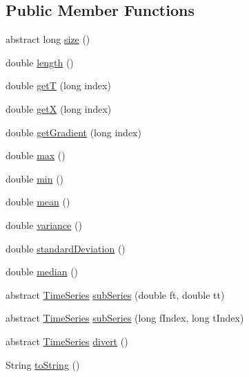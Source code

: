 \subsection*{Public Member Functions}
\begin{DoxyCompactItemize}
\item 
abstract long \hyperlink{classtimeseries_1_1_time_series_a390324a52568f45892838f08142b8e44}{size} ()
\item 
double \hyperlink{classtimeseries_1_1_time_series_a21a48f6a58aefd8b7261acccfc442425}{length} ()
\item 
double \hyperlink{classtimeseries_1_1_time_series_a756d884d57220f887a2425e850450f33}{get\+T} (long index)
\item 
double \hyperlink{classtimeseries_1_1_time_series_a1bf3cb62b9976193264b68ef8d001919}{get\+X} (long index)
\item 
double \hyperlink{classtimeseries_1_1_time_series_a0cd53da9484fd4ee3b5c5110e79c0a7e}{get\+Gradient} (long index)
\item 
double \hyperlink{classtimeseries_1_1_time_series_ac841bb482c0ef9fe79839c255406c8c6}{max} ()
\item 
double \hyperlink{classtimeseries_1_1_time_series_a06f25367736b3f59807e6f060650bc7e}{min} ()
\item 
double \hyperlink{classtimeseries_1_1_time_series_a70d9b8388e8b729ce9a719b25d3016aa}{mean} ()
\item 
double \hyperlink{classtimeseries_1_1_time_series_a255d92682fb235b5c9dbb4d803d7f8d3}{variance} ()
\item 
double \hyperlink{classtimeseries_1_1_time_series_a326e8450cc7ce9bc2118255227d20664}{standard\+Deviation} ()
\item 
double \hyperlink{classtimeseries_1_1_time_series_a7851e2236b47e0c3440a949bda2bea91}{median} ()
\item 
abstract \hyperlink{classtimeseries_1_1_time_series}{Time\+Series} \hyperlink{classtimeseries_1_1_time_series_ac3422314d9131982a0c8f35eb4a99fc2}{sub\+Series} (double ft, double tt)
\item 
abstract \hyperlink{classtimeseries_1_1_time_series}{Time\+Series} \hyperlink{classtimeseries_1_1_time_series_a13599863c16f9c8c029c1f0ba9a17202}{sub\+Series} (long f\+Index, long t\+Index)
\item 
abstract \hyperlink{classtimeseries_1_1_time_series}{Time\+Series} \hyperlink{classtimeseries_1_1_time_series_a91f886289adc77eb25bb5f58667d2049}{divert} ()
\item 
String \hyperlink{classtimeseries_1_1_time_series_abc1e7b0fb89081f2214c7ef29efe23b2}{to\+String} ()
\end{DoxyCompactItemize}
